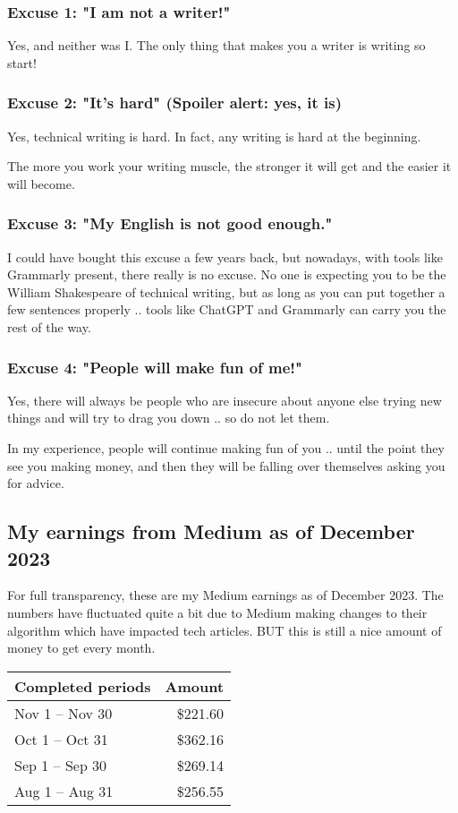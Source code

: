 \documentclass[11pt]{article}
\begin{document}
\subsubsection*{Excuse 1: "I am not a writer!"}
Yes, and neither was I. The only thing that makes you a writer is writing so start!

\subsubsection*{Excuse 2: "It's hard" (Spoiler alert: yes, it is)}
Yes, technical writing is hard. In fact, any writing is hard at the beginning.

The more you work your writing muscle, the stronger it will get and the easier it will become.

\subsubsection*{Excuse 3: "My English is not good enough."}
I could have bought this excuse a few years back, but nowadays, with tools like Grammarly present, there really is no excuse. No one is expecting you to be the William Shakespeare of technical writing, but as long as you can put together a few sentences properly .. tools like ChatGPT and Grammarly can carry you the rest of the way.

\subsubsection*{Excuse 4: "People will make fun of me!"}
Yes, there will always be people who are insecure about anyone else trying new things and will try to drag you down .. so do not let them.

In my experience, people will continue making fun of you .. until the point they see you making money, and then they will be falling over themselves asking you for advice.

\subsection*{My earnings from Medium as of December 2023}
For full transparency, these are my Medium earnings as of December 2023. The numbers have fluctuated quite a bit due to Medium making changes to their algorithm which have impacted tech articles. BUT this is still a nice amount of money to get every month.

\begin{center}
\begin{tabular}{lr}
\toprule
\textbf{Completed periods} & \textbf{Amount} \\
\midrule
Nov 1 – Nov 30 & \$221.60 \\
Oct 1 – Oct 31 & \$362.16 \\
Sep 1 – Sep 30 & \$269.14 \\
Aug 1 – Aug 31 & \$256.55 \\
\bottomrule
\end{tabular}
\end{center}
\end{document}
